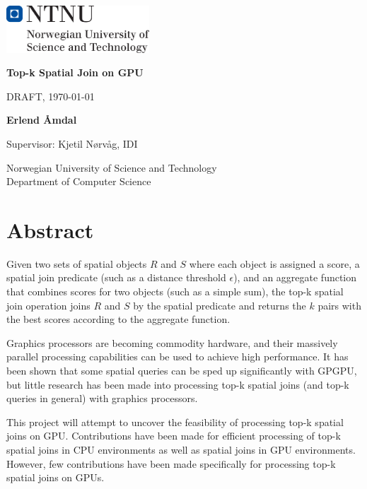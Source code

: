 \documentclass[12pt]{report}
\begin{document}
\begin{titlepage}
    \sffamily
    \setlength{\parindent}{0pt}
    \includegraphics[width=0.4\textwidth]{ntnu}

    \vspace*{2cm}

    \Huge
    \textbf{Top-k Spatial Join on GPU}

    \vspace{0.5cm}
    \LARGE
    DRAFT, \today

    \vspace{1.5cm}

    \textbf{Erlend Åmdal}

    \vfill

    \large
    Supervisor: Kjetil Nørvåg, IDI

    \vspace{1.5cm}
    Norwegian University of Science and Technology\\
    Department of Computer Science
\end{titlepage}

\chapter*{Abstract}
Given two sets of spatial objects \(R\) and \(S\) where each object is assigned a score, a spatial join predicate (such as a distance threshold \(\epsilon\)), and an aggregate function that combines scores for two objects (such as a simple sum), the top-k spatial join operation joins \(R\) and \(S\) by the spatial predicate and returns the \(k\) pairs with the best scores according to the aggregate function. %

Graphics processors are becoming commodity hardware, and their massively parallel processing capabilities can be used to achieve high performance. It has been shown that some spatial queries can be sped up significantly with GPGPU, but little research has been made into processing top-k spatial joins (and top-k queries in general) with graphics processors.

This project will attempt to uncover the feasibility of processing top-k spatial joins on GPU\@. Contributions have been made for efficient processing of top-k spatial joins in CPU environments as well as spatial joins in GPU environments. However, few contributions have been made specifically for processing top-k spatial joins on GPUs.
\end{document}
